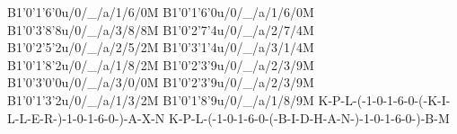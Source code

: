 B1'0'1'6'0u/0/_/a/1/6/0M
B1'0'1'6'0u/0/_/a/1/6/0M
B1'0'3'8'8u/0/_/a/3/8/8M
B1'0'2'7'4u/0/_/a/2/7/4M
B1'0'2'5'2u/0/_/a/2/5/2M
B1'0'3'1'4u/0/_/a/3/1/4M
B1'0'1'8'2u/0/_/a/1/8/2M
B1'0'2'3'9u/0/_/a/2/3/9M
B1'0'3'0'0u/0/_/a/3/0/0M
B1'0'2'3'9u/0/_/a/2/3/9M
B1'0'1'3'2u/0/_/a/1/3/2M
B1'0'1'8'9u/0/_/a/1/8/9M
K-P-L-(-1-0-1-6-0-(-K-I-L-L-E-R-)-1-0-1-6-0-)-A-X-N
K-P-L-(-1-0-1-6-0-(-B-I-D-H-A-N-)-1-0-1-6-0-)-B-M
